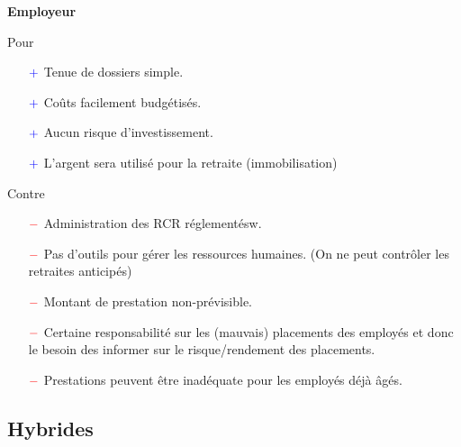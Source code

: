 \documentclass[10pt, french]{article}
\begin{document}
\begin{multicols*}{3}
\begin{center}
	\textbf{Employeur}
\end{center}
Pour
\begin{itemize}
	\item[$\color{blue}+$]	Tenue de dossiers simple.
	\item[$\color{blue}+$]	Coûts facilement budgétisés.
	\item[$\color{blue}+$]	Aucun risque d'investissement.
	\item[$\color{blue}+$]	L'argent sera utilisé pour la retraite (immobilisation)
\end{itemize}

Contre
\begin{itemize}
	\item[$\color{red}-$]	Administration des RCR réglementésw.
	\item[$\color{red}-$]	Pas d'outils pour gérer les ressources humaines. (On ne peut contrôler les retraites anticipés)
	\item[$\color{red}-$]	Montant de prestation non-prévisible.
	\item[$\color{red}-$]	Certaine responsabilité sur les (mauvais) placements des employés et donc le besoin des informer sur le risque/rendement des placements.
	\item[$\color{red}-$]	Prestations peuvent être inadéquate pour les employés déjà âgés.
\end{itemize}

\newpage

\subsection*{Hybrides}


\end{multicols*}
\end{document}
